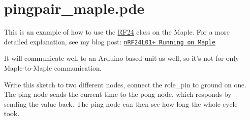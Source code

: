 \hypertarget{pingpair_maple_8pde-example}{\section{pingpair\+\_\+maple.\+pde}
}
This is an example of how to use the \hyperlink{class_r_f24}{R\+F24} class on the Maple. For a more detailed explanation, see my blog post\+: \href{http://maniacbug.wordpress.com/2011/12/14/nrf24l01-running-on-maple-3/}{\tt n\+R\+F24\+L01+ Running on Maple}

It will communicate well to an Arduino-\/based unit as well, so it's not for only Maple-\/to-\/\+Maple communication.

Write this sketch to two different nodes, connect the role\+\_\+pin to ground on one. The ping node sends the current time to the pong node, which responds by sending the value back. The ping node can then see how long the whole cycle took.


\begin{DoxyCodeInclude}
\end{DoxyCodeInclude}
 